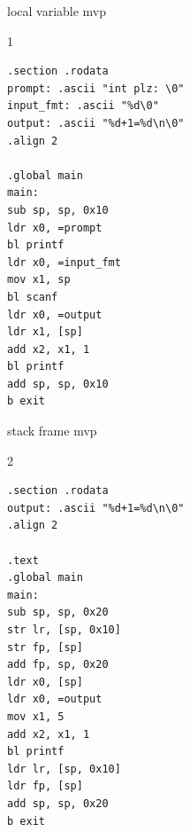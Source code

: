












\begin{frame}[fragile]{local variable mvp}
	\begin{multicols}{1}
		{\small
			\begin{verbatim}
.section .rodata
prompt: .ascii "int plz: \0"
input_fmt: .ascii "%d\0"
output: .ascii "%d+1=%d\n\0"
.align 2

.global main
main: 
sub sp, sp, 0x10
ldr x0, =prompt
bl printf
ldr x0, =input_fmt
mov x1, sp
bl scanf
ldr x0, =output
ldr x1, [sp]
add x2, x1, 1
bl printf
add sp, sp, 0x10
b exit
\end{verbatim}
		}
	\end{multicols}
\end{frame}






\begin{frame}[fragile]{stack frame mvp}
	\begin{multicols}{2}
		{\small
			\begin{verbatim}
.section .rodata
output: .ascii "%d+1=%d\n\0"
.align 2

.text
.global main
main: 
sub sp, sp, 0x20
str lr, [sp, 0x10]
str fp, [sp]
add fp, sp, 0x20
ldr x0, [sp]
ldr x0, =output
mov x1, 5
add x2, x1, 1
bl printf
ldr lr, [sp, 0x10]
ldr fp, [sp]
add sp, sp, 0x20
b exit
\end{verbatim}
		}
	\end{multicols}
\end{frame}





